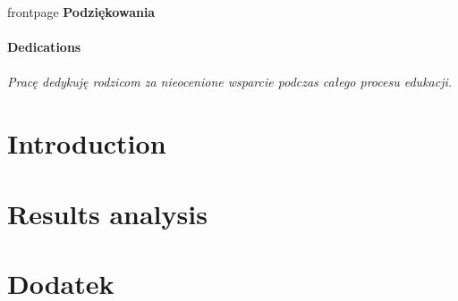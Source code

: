 


{frontpage} %
\newpage
\textbf{Podziękowania}\\\\
\textbf{Dedications}\\\\
\textit{Pracę dedykuję rodzicom za nieocenione wsparcie podczas całego procesu edukacji.}
\newpage
\tableofcontents %
\newpage
\section{Introduction}


\newpage


\setlength\intextsep{0.3cm}

\newpage
\section{Results analysis}


\newpage


\newpage
\section{Dodatek}

\newpage
\printbibliography[heading=bibintoc,title=Bibliography]
